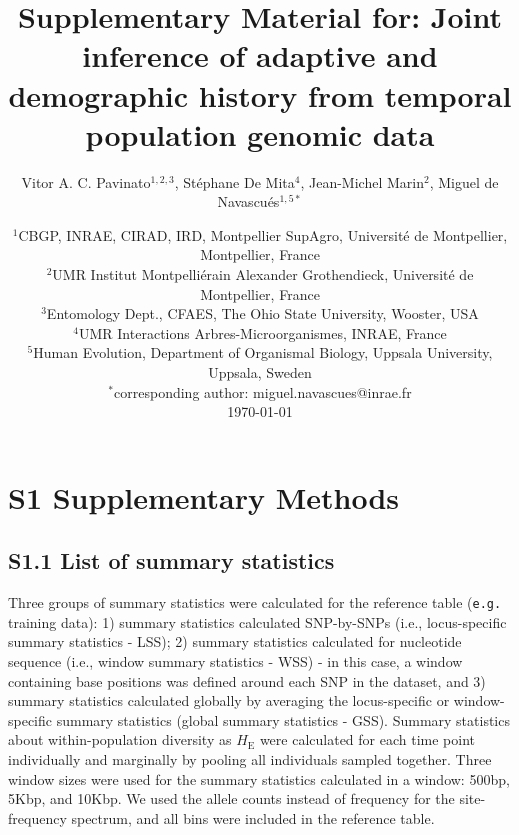 \documentclass[a4paper, 12pt]{article}
\title{Supplementary Material for: Joint inference of adaptive and demographic history from temporal population genomic data}
\author{\small
            Vitor A. C. Pavinato$^{1,2,3}$, Stéphane De Mita$^4$, Jean-Michel Marin$^2$, Miguel de Navascués$^{1,5*}$}
\date{{\footnotesize %
    $^1$CBGP, INRAE, CIRAD, IRD, Montpellier SupAgro, Université de Montpellier, Montpellier, France\\%
    $^2$UMR Institut Montpelliérain Alexander Grothendieck, Université de Montpellier, France\\%
    $^3$Entomology Dept., CFAES, The Ohio State University, Wooster, USA\\%
    $^4$UMR Interactions Arbres-Microorganismes, INRAE, France \\%
    $^5$Human Evolution, Department of Organismal Biology, Uppsala University, Uppsala, Sweden\\%
    $^*$corresponding author: miguel.navascues@inrae.fr\\[2ex]%
    }
    \footnotesize\today    
}
\begin{document}
\maketitle




\newpage


\section*{S1 Supplementary Methods}

\subsection*{S1.1 List of summary statistics}

Three groups of summary statistics were calculated for the reference table (\texttt{e.g.} training data): 1) summary statistics calculated SNP-by-SNPs (i.e., locus-specific summary statistics - LSS); 2) summary statistics calculated for nucleotide sequence (i.e., window summary statistics - WSS) - in this case, a window containing base positions was defined around each SNP in the dataset, and 3) summary statistics calculated globally by averaging the locus-specific or window-specific summary statistics (global summary statistics - GSS). Summary statistics about within-population diversity as $H_{\mathrm{E}}$ were calculated for each time point individually and marginally by pooling all individuals sampled together. Three window sizes were used for the summary statistics calculated in a window: 500bp, 5Kbp, and 10Kbp. We used the allele counts instead of frequency for the site-frequency spectrum, and all bins were included in the reference table.
\end{document}
